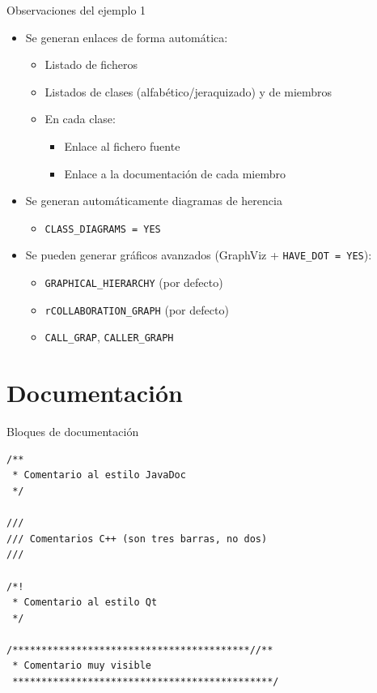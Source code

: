 \documentclass[12pt,xcolor=svgnames]{beamer}
\begin{document}
\begin{frame}{Observaciones del ejemplo 1}
  \begin{itemize}
  \item Se generan enlaces de forma automática:
    \begin{itemize}
    \item Listado de ficheros
    \item Listados de clases (alfabético/jeraquizado) y de miembros
    \item En cada clase: 
      \begin{itemize}
      \item Enlace al fichero fuente
      \item Enlace a la documentación de cada miembro
      \end{itemize}
    \end{itemize}
  \item Se generan automáticamente diagramas de herencia
    \begin{itemize}
    \item \texttt{CLASS\_DIAGRAMS = YES}
    \end{itemize}
  \item Se pueden generar gráficos avanzados (GraphViz + \texttt{HAVE\_DOT =
      YES}):
    \begin{itemize}
    \item \texttt{GRAPHICAL\_HIERARCHY} (por defecto)
    \item \texttt{rCOLLABORATION\_GRAPH} (por defecto)
    \item \texttt{CALL\_GRAP}, \texttt{CALLER\_GRAPH}
    \end{itemize}
  \end{itemize}
\end{frame}

\section{Documentación}

\begin{frame}[fragile]{Bloques de documentación}
  \begin{verbatim}
/**
 * Comentario al estilo JavaDoc
 */

///
/// Comentarios C++ (son tres barras, no dos)
///

/*!
 * Comentario al estilo Qt
 */

/*****************************************//**
 * Comentario muy visible
 *********************************************/
  \end{verbatim}
\end{frame}
\end{document}
